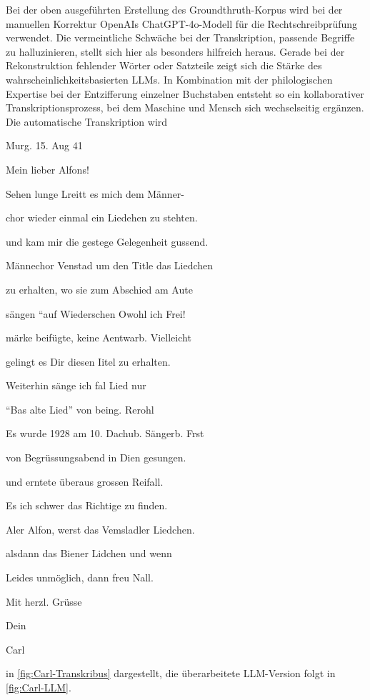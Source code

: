 \documentclass[12pt, a4paper, ngerman, bidi=default]{article}
\begin{document}
\begin{minipage}[t]{0.52\textwidth}
  \justifying
  \noindent
Bei der oben ausgeführten
Erstellung des Groundthruth-Korpus wird bei der manuellen Korrektur OpenAIs ChatGPT-4o-Modell für die Rechtschreibprüfung verwendet. Die vermeintliche Schwäche 
bei der Transkription, passende Begriffe zu halluzinieren, stellt sich hier als besonders hilfreich heraus. Gerade bei der Rekonstruktion fehlender Wörter oder Satzteile zeigt sich die Stärke des wahrscheinlichkeitsbasierten LLMs.
In Kombination mit der philologischen Expertise bei der Entzifferung einzelner Buchstaben entsteht so ein kollaborativer Transkriptionsprozess, 
bei dem Maschine und Mensch sich wechselseitig ergänzen. Die automatische Transkription wird
\end{minipage}
\vspace{1em}
\begin{minipage}[t]{0.5\textwidth}
    \centering
    \vspace*{0cm}
  \begin{tcolorbox}[colback=oldLetter, colframe=black, sharp corners, width=0.8\textwidth]
    \tiny{Murg. 15. Aug 41 
    
    Mein lieber Alfons! 

    Sehen lunge Lreitt es mich dem Männer- 

    chor wieder einmal ein Liedehen zu stehten. 

    und kam mir die gestege Gelegenheit gussend. 

    Männechor Venstad um den Title das Liedchen 

    zu erhalten, wo sie zum Abschied am Aute 

    sängen ``auf Wiederschen Owohl ich Frei! 

    märke beifügte, keine Aentwarb. Vielleicht 

    gelingt es Dir diesen Iitel zu erhalten. 
    
    Weiterhin sänge ich fal Lied nur 
    
    ``Bas alte Lied'' von being. Rerohl 

    Es wurde 1928 am 10. Dachub. Sängerb. Frst 

    von Begrüssungsabend in Dien gesungen. 

    und erntete überaus grossen Reifall. 

    Es ich schwer das Richtige zu finden. 

    Aler Alfon, werst das Vemsladler Liedchen. 

    alsdann das Biener Lidchen und wenn 

    Leides unmöglich, dann freu Nall. 

    Mit herzl. Grüsse 

    Dein 

    Carl} 
  \end{tcolorbox}
\end{minipage}
\hfill%
\vspace{0.76cm}
\noindent in \autoref{fig:Carl-Transkribus} dargestellt, die überarbeitete LLM-Version folgt in \autoref{fig:Carl-LLM}.
\end{document}
